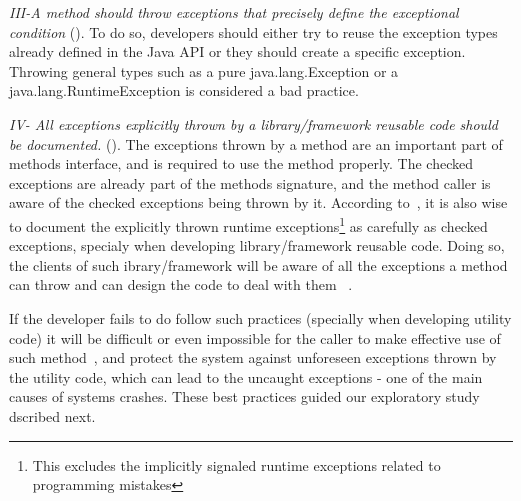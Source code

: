 \documentclass[conference]{IEEEtran}
\begin{document}

\emph{III-A method should throw exceptions that precisely define the
exceptional condition} (\cite{gosling2000java,bloch2008effective}). To do so,
developers should either try to reuse the exception types already defined in the
Java API or they should create a specific exception. Throwing general types such as a
pure java.lang.Exception or a java.lang.RuntimeException is considered a bad practice.



\emph{IV- All exceptions explicitly thrown by a library/framework reusable code should be documented.}
(\cite{mandrioli1992advances,gosling2000java,wirfs2006toward,bloch2008effective}).
The exceptions thrown by a method are an important part of methods interface,
and is required to use the method properly. The checked exceptions are already
part of the  methods signature, and the method caller is aware of the checked
exceptions being thrown by it. According to~\cite{bloch2008effective}, it is
also wise to document the explicitly thrown runtime exceptions\footnote{This
excludes the implicitly signaled runtime exceptions related to programming
mistakes} as carefully as checked exceptions, specialy when developing
 library/framework reusable code. Doing so, the clients of such ibrary/framework
will be aware of all the exceptions a method can throw and can design the code
to deal with them ~\cite{Robil00}. 

If the developer fails to do follow such practices (specially when developing 
utility code) it will be difficult or even impossible for the caller to 
make effective use of such method~\cite{wirfs2006toward, bloch2008effective},
and protect the system against unforeseen exceptions thrown by the utility code,
which can lead to the uncaught exceptions - one of the main causes of 
systems crashes. These best practices guided our exploratory study dscribed next.
\end{document}
